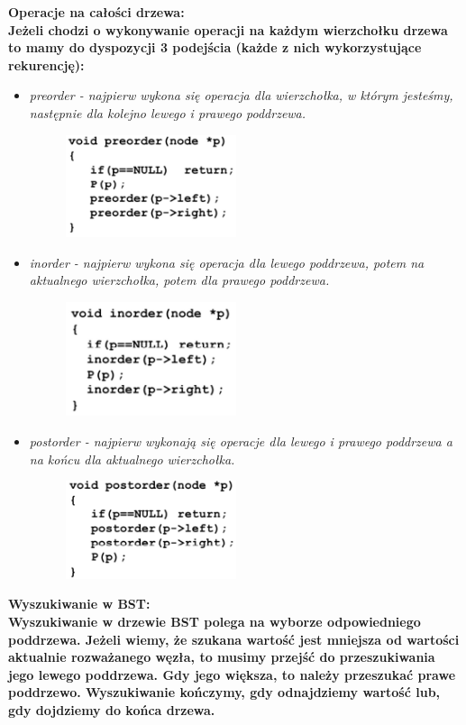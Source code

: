 \documentclass[a4paper,12pt]{article}
\newcommand{\h}[1]{\noindent \bf #1 \rm \\ \noindent}
\newcommand{\italic}[1]{\it #1 \rm}
\begin{document}
\newpage
\h{Operacje na całości drzewa:}
Jeżeli chodzi o wykonywanie operacji na każdym wierzchołku drzewa to mamy do dyspozycji 3 podejścia (każde z nich wykorzystujące rekurencję):
\begin{itemize}
	\item \italic{preorder} - najpierw wykona się operacja dla wierzchołka, w którym jesteśmy, następnie dla kolejno lewego i prawego poddrzewa.
	\begin{figure}[H]
		\centering
		\includegraphics[width=5cm]{fig2.png}
	\end{figure}

	\item \italic{inorder} - najpierw wykona się operacja dla lewego poddrzewa, potem na aktualnego wierzchołka, potem dla prawego poddrzewa.
	\begin{figure}[H]
		\centering
		\includegraphics[width=5cm]{fig3.png}
	\end{figure}

	\item \italic{postorder} - najpierw wykonają się operacje dla lewego i prawego poddrzewa a na końcu dla aktualnego wierzchołka.
	\begin{figure}[H]
		\centering
		\includegraphics[width=5cm]{fig4.png}
	\end{figure}
\end{itemize}

\newpage
\h{Wyszukiwanie w BST:}
Wyszukiwanie w drzewie BST polega na wyborze odpowiedniego poddrzewa. Jeżeli wiemy, że szukana wartość jest mniejsza od wartości aktualnie rozważanego węzła, to musimy przejść do przeszukiwania jego lewego poddrzewa. Gdy jego większa, to należy przeszukać prawe poddrzewo. Wyszukiwanie kończymy, gdy odnajdziemy wartość lub, gdy dojdziemy do końca drzewa.\\
\end{document}

